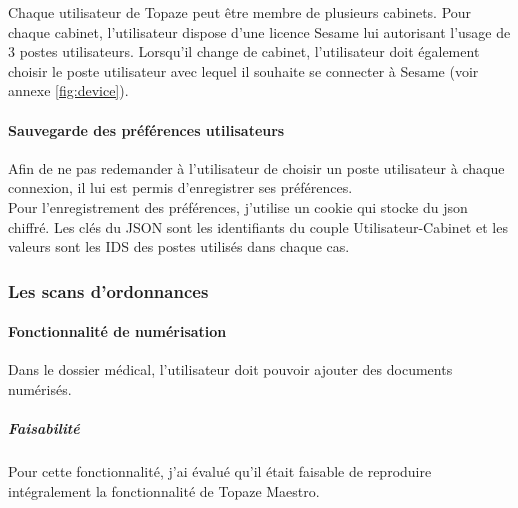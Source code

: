 Chaque utilisateur de Topaze peut être membre de plusieurs cabinets. Pour chaque cabinet, l'utilisateur dispose d'une licence Sesame lui autorisant l'usage de 3 postes utilisateurs. Lorsqu'il change de cabinet, l'utilisateur doit également choisir le poste utilisateur avec lequel il souhaite se connecter à Sesame (voir annexe \ref{fig:device}).\\

\paragraph*{Sauvegarde des préférences utilisateurs\\}
Afin de ne pas redemander à l'utilisateur de choisir un poste utilisateur à chaque connexion, il lui est permis d'enregistrer ses préférences.\\
Pour l'enregistrement des préférences, j'utilise un cookie qui stocke du json chiffré. Les clés du JSON sont les identifiants du couple Utilisateur-Cabinet et les valeurs sont les IDS des postes utilisés dans chaque cas.






\subsubsection{Les scans d'ordonnances}
\paragraph*{Fonctionnalité de numérisation\\}
Dans le dossier médical, l'utilisateur doit pouvoir ajouter des documents numérisés.

\subparagraph*{Faisabilité}
Pour cette fonctionnalité, j'ai évalué qu'il était faisable de reproduire intégralement la fonctionnalité de Topaze Maestro.\\

